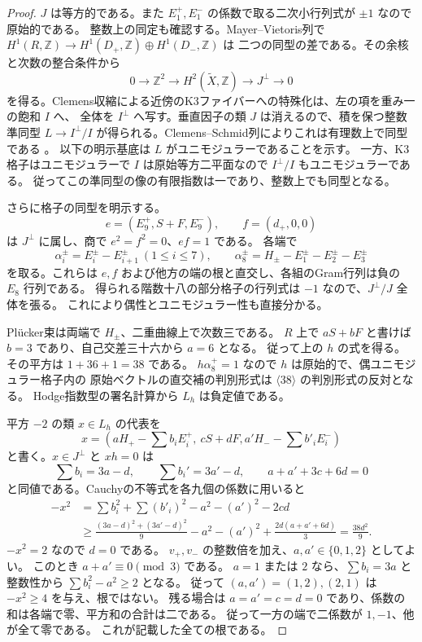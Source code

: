 \begin{proof}
$J$ は等方的である。また $E_1^+,E_1^-$ の係数で取る二次小行列式が $\pm1$ なので原始的である。
整数上の同定も確認する。Mayer--Vietoris列で
$H^1(R,\mathbb Z)\to H^1(D_+,\mathbb Z)\oplus H^1(D_-,\mathbb Z)$ は
二つの同型の差である。その余核と次数の整合条件から
\[
 0\longrightarrow\mathbb Z^2\longrightarrow H^2(\widetilde X,\mathbb Z)
 \longrightarrow J^\perp\longrightarrow0
\]
を得る。Clemens収縮による近傍のK3ファイバーへの特殊化は、左の項を重み一の飽和 $I$ へ、
全体を $I^\perp$ へ写す。垂直因子の類 $J$ は消えるので、積を保つ整数準同型
$L\to I^\perp/I$ が得られる。Clemens--Schmid列によりこれは有理数上で同型である
\cite{FriedmanTorelli,KondoTypeII}。
以下の明示基底は $L$ がユニモジュラーであることを示す。
一方、K3格子はユニモジュラーで $I$ は原始等方二平面なので $I^\perp/I$ もユニモジュラーである。
従ってこの準同型の像の有限指数は一であり、整数上でも同型となる。

さらに格子の同型を明示する。
\[
 e=(E_9^+,S+F,E_9^-),\qquad f=(d_+,0,0)
\]
は $J^\perp$ に属し、商で $e^2=f^2=0$、$ef=1$ である。
各端で
\[
 \alpha_i^\pm=E_i^\pm-E_{i+1}^\pm\ (1\le i\le7),\qquad
 \alpha_8^\pm=H_\pm-E_1^\pm-E_2^\pm-E_3^\pm
\]
を取る。これらは $e,f$ および他方の端の根と直交し、各組のGram行列は負の $E_8$ 行列である。
得られる階数十八の部分格子の行列式は $-1$ なので、$J^\perp/J$ 全体を張る。
これにより偶性とユニモジュラー性も直接分かる。

Pl\"ucker束は両端で $H_\pm$、二重曲線上で次数三である。
$R$ 上で $aS+bF$ と書けば $b=3$ であり、自己交差三十六から $a=6$ となる。
従って上の $h$ の式を得る。
その平方は $1+36+1=38$ である。
$h\alpha_8^+=1$ なので $h$ は原始的で、偶ユニモジュラー格子内の
原始ベクトルの直交補の判別形式は $\langle38\rangle$ の判別形式の反対となる。
Hodge指数型の署名計算から $L_h$ は負定値である。

平方 $-2$ の類 $x\in L_h$ の代表を
\[
 x=\left(aH_+-\sum b_iE_i^+,\ cS+dF,
             a'H_--\sum b'_iE_i^-\right)
\]
と書く。$x\in J^\perp$ と $xh=0$ は
\[
 \sum b_i=3a-d,\qquad \sum b_i'=3a'-d,\qquad
 a+a'+3c+6d=0
\]
と同値である。Cauchyの不等式を各九個の係数に用いると
\begin{align*}
 -x^2
 &=\sum b_i^2+\sum (b'_i)^2-a^2-(a')^2-2cd\\
 &\ge \frac{(3a-d)^2+(3a'-d)^2}{9}-a^2-(a')^2
            +\frac{2d(a+a'+6d)}3
 =\frac{38d^2}{9}.
\end{align*}
$-x^2=2$ なので $d=0$ である。
$v_+,v_-$ の整数倍を加え、$a,a'\in\{0,1,2\}$ としてよい。
このとき $a+a'\equiv0\pmod3$ である。
$a=1$ または $2$ なら、$\sum b_i=3a$ と整数性から
$\sum b_i^2-a^2\ge2$ となる。
従って $(a,a')=(1,2),(2,1)$ は $-x^2\ge4$ を与え、根ではない。
残る場合は $a=a'=c=d=0$ であり、係数の和は各端で零、平方和の合計は二である。
従って一方の端で二係数が $1,-1$、他が全て零である。
これが記載した全ての根である。


\end{proof}
